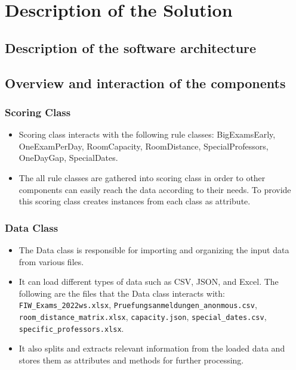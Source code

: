\section{Description of the Solution}
\subsection{Description of the software architecture}


\subsection{Overview and interaction of the components}


\subsubsection{Scoring Class}


\begin{itemize}
\item Scoring class interacts with the following rule classes: BigExamsEarly, OneExamPerDay, RoomCapacity, RoomDistance, SpecialProfessors, OneDayGap, SpecialDates.
\item The all rule classes are gathered into scoring class in order to other components can easily reach the data according to their needs. To provide this scoring class creates instances from each class as attribute.
\end{itemize}


\subsubsection{Data Class}


\begin{itemize}
\item The Data class is responsible for importing and organizing the input data from various files.
\item It can load different types of data such as CSV, JSON, and Excel. The following are the files that the Data class interacts with: \texttt{FIW\_Exams\_2022ws.xlsx}, \texttt{Pruefungsanmeldungen\_anonmous.csv}, \texttt{room\_distance\_matrix.xlsx}, \texttt{capacity.json}, \texttt{special\_dates.csv}, \texttt{specific\_professors.xlsx}.
\item It also splits and extracts relevant information from the loaded data and stores them as attributes and methods for further processing.
\end{itemize}


